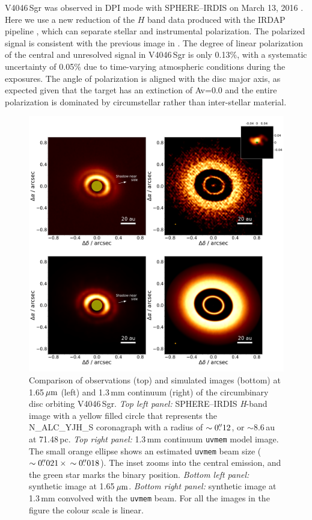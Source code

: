 \documentclass[fleqn,usenatbib,useAMS]{mnras}
\begin{document}
V4046\,Sgr was observed in DPI mode with SPHERE--IRDIS on March 13, 2016 \citep[see][for details]{Avenhaus_2018}. Here we use a new reduction of the $H$ band data produced with the IRDAP pipeline \citep{2020A&A...633A..64V}, which can separate stellar and instrumental polarization. The polarized signal is consistent with the previous image in \citet{Avenhaus_2018}. The degree of linear polarization of the central and unresolved signal in V4046\,Sgr is only 0.13\%, with a systematic uncertainty of 0.05\% due to time-varying atmospheric conditions during the exposures. The angle of polarization is aligned with the disc major axis, as expected given that the target has an extinction of Av=0.0 \citep{2016ApJ...828...69M} and the entire polarization is dominated by circumstellar rather than inter-stellar material. 

\begin{figure}
  \includegraphics[width=\textwidth]{hot_two_E.pdf}
  \caption{Comparison of observations (top) and simulated images (bottom) at 1.65\,$\hbox{$\mu$m}$ (left) and 1.3\,mm continuum (right) of the circumbinary disc orbiting V4046\,Sgr. \textit{Top left panel:} SPHERE--IRDIS \textit{H}-band image with a yellow filled circle that represents the N\_ALC\_YJH\_S coronagraph with a radius of $\sim0\hbox{$.\!\!^{\prime\prime}$}12$, or $\sim$8.6\,au at 71.48\,pc. \textit{Top right panel:} 1.3\,mm continuum {\tt uvmem} model image. The small orange ellipse shows an estimated {\tt uvmem} beam size ($\sim0\hbox{$.\!\!^{\prime\prime}$}021 \, \times \, \sim0\hbox{$.\!\!^{\prime\prime}$}018$). The inset zooms into the central emission, and the green star marks the binary position. \textit{Bottom left panel:} synthetic image at 1.65\,$\hbox{$\mu$m}$. \textit{Bottom right panel:} synthetic image at 1.3\,mm convolved with the {\tt uvmem} beam. For all the images in the figure the colour scale is linear.}
  \label{fig:images_vs_simulated}
\end{figure}
\end{document}
